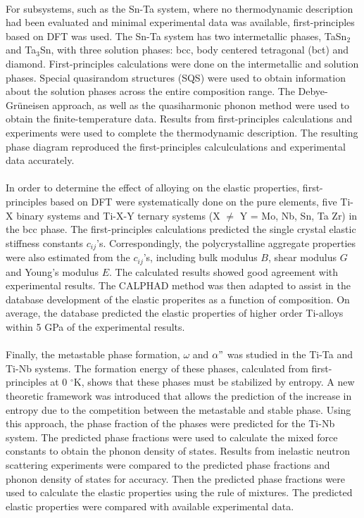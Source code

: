 \paragraph*{} For subsystems, such as the Sn-Ta system, where no thermodynamic description had been evaluated and minimal experimental data was available, first-principles based on DFT was used. The Sn-Ta system has two intermetallic phases, TaSn$_{2}$ and Ta$_{3}$Sn, with three solution phases: bcc, body centered tetragonal (bct) and diamond. First-principles calculations were done on the intermetallic and solution phases. Special quasirandom structures (SQS) were used to obtain information about the solution phases across the entire composition range. The Debye-Gr\"uneisen approach, as well as the quasiharmonic phonon method were used to obtain the finite-temperature data. Results from first-principles calculations and experiments were used to complete the thermodynamic description. The resulting phase diagram reproduced the first-principles calculculations and experimental data accurately.
\paragraph*{}In order to determine the effect of alloying on the elastic properties, first-principles based on DFT were systematically done on the pure elements, five Ti-X binary systems and Ti-X-Y ternary systems (X $\neq $ Y = Mo, Nb, Sn, Ta Zr) in the bcc phase. The first-principles calculations predicted the single crystal elastic stiffness constants $c_{ij}$'s. Correspondingly, the polycrystalline aggregate properties were also estimated from the $c_{ij}$'s, including bulk modulus $B$, shear modulus $G$ and Young's modulus $E$. The calculated results showed good agreement with experimental results. The CALPHAD method was then adapted to assist in the database development of the elastic properites as a function of composition. On average, the database predicted the elastic properties of higher order Ti-alloys within 5 GPa of the experimental results.
\paragraph*{} Finally, the metastable phase formation, $\omega$ and $\alpha"$ was studied in the Ti-Ta and Ti-Nb systems. The formation energy of these phases, calculated from first-principles at 0 $^\circ$K, shows that these phases must be stabilized by entropy. A new theoretic framework was introduced that allows the prediction of the increase in entropy due to the competition between the metastable and stable phase. Using this approach, the phase fraction of the phases were predicted for the Ti-Nb system. The predicted phase fractions were used to calculate the mixed force constants to obtain the phonon density of states. Results from inelastic neutron scattering experiments were compared to the predicted phase fractions and phonon density of states for accuracy. Then the predicted phase fractions were used to calculate the elastic properties using the rule of mixtures. The predicted elastic properties were compared with available experimental data.
